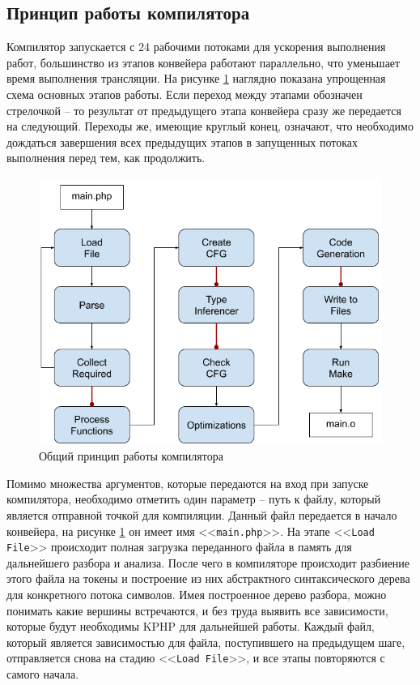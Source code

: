 \subsection{Принцип работы компилятора}
Компилятор запускается с 24 рабочими потоками для ускорения выполнения работ, большинство из этапов конвейера работают параллельно, что уменьшает время выполнения трансляции.
На рисунке \ref{fig:compiler_arch} наглядно показана упрощенная схема основных этапов работы.
Если переход между этапами обозначен стрелочкой -- то результат от предыдущего этапа конвейера сразу же передается на следующий.
Переходы же, имеющие круглый конец, означают, что необходимо дождаться завершения всех предыдущих этапов в запущенных потоках выполнения перед тем, как продолжить.
\begin{figure}[H]
    \caption{Общий принцип работы компилятора}
    \label{fig:compiler_arch}
    \centering
    \includegraphics[width=\linewidth]{images/compiler_arch}
\end{figure}

Помимо множества аргументов, которые передаются на вход при запуске компилятора, необходимо отметить один параметр -- путь к файлу, который является отправной точкой для компиляции.
Данный файл передается в начало конвейера, на рисунке \ref{fig:compiler_arch} он имеет имя <<\verb|main.php|>>.
На этапе <<\verb|Load File|>> происходит полная загрузка переданного файла в память для дальнейшего разбора и анализа.
После чего в компиляторе происходит разбиение этого файла на токены и построение из них абстрактного синтаксического дерева для конкретного потока символов.
Имея построенное дерево разбора, можно понимать какие вершины встречаются, и без труда выявить все зависимости, которые будут необходимы KPHP для дальнейшей работы.
Каждый файл, который является зависимостью для файла, поступившего на предыдущем шаге, отправляется снова на стадию <<\verb|Load File|>>, и все этапы повторяются с самого начала.

